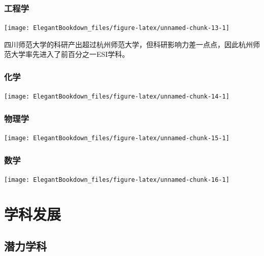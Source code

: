 \documentclass[cn, 11pt, fancy, hide]{elegantbook}
\begin{document}
\hypertarget{ux5de5ux7a0bux5b66}{%
\subsection{工程学}\label{ux5de5ux7a0bux5b66}}

\begin{center}\texttt{[image: ElegantBookdown\_files/figure-latex/unnamed-chunk-13-1]} \end{center}

四川师范大学的科研产出超过杭州师范大学，但科研影响力差一点点，因此杭州师范大学率先进入了前百分之一ESI学科。

\hypertarget{ux5316ux5b66}{%
\subsection{化学}\label{ux5316ux5b66}}

\begin{center}\texttt{[image: ElegantBookdown\_files/figure-latex/unnamed-chunk-14-1]} \end{center}

\hypertarget{ux7269ux7406ux5b66}{%
\subsection{物理学}\label{ux7269ux7406ux5b66}}

\begin{center}\texttt{[image: ElegantBookdown\_files/figure-latex/unnamed-chunk-15-1]} \end{center}

\hypertarget{ux6570ux5b66}{%
\subsection{数学}\label{ux6570ux5b66}}

\begin{center}\texttt{[image: ElegantBookdown\_files/figure-latex/unnamed-chunk-16-1]} \end{center}

\hypertarget{progress}{%
\chapter{学科发展}\label{progress}}

\hypertarget{ux6f5cux529bux5b66ux79d1}{%
\section{潜力学科}\label{ux6f5cux529bux5b66ux79d1}}
\end{document}
